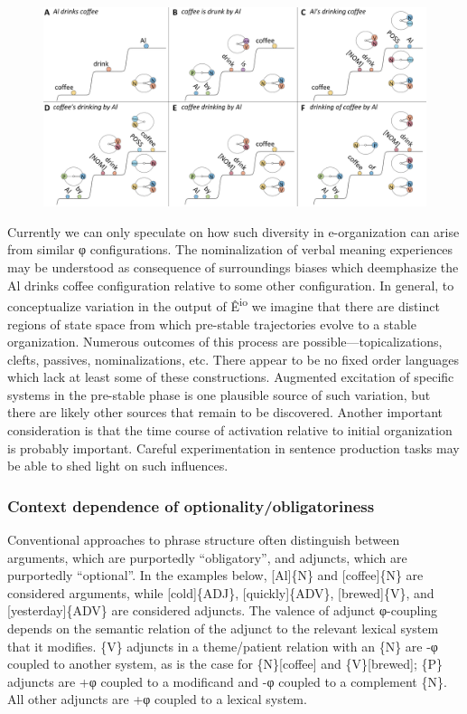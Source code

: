   
\begin{figure}
\includegraphics[width=\textwidth]{figures/Tilsen-img82.png}
\caption{\missingcaption}
\label{fig:}
\end{figure}
 

  Currently we can only speculate on how such diversity in e-organization can arise from similar φ configurations. The nominalization of verbal meaning experiences may be understood as consequence of surroundings biases which deemphasize the {\textbar}Al drinks coffee{\textbar} configuration relative to some other configuration. In general, to conceptualize variation in the output of Ê\textsuperscript{io} we imagine that there are distinct regions of state space from which pre-stable trajectories evolve to a stable organization. Numerous outcomes of this process are possible—topicalizations, clefts, passives, nominalizations, etc. There appear to be no fixed order languages which lack at least some of these constructions. Augmented excitation of specific systems in the pre-stable phase is one plausible source of such variation, but there are likely other sources that remain to be discovered. Another important consideration is that the time course of activation relative to initial organization is probably important. Careful experimentation in sentence production tasks may be able to shed light on such influences.

\subsubsection{Context dependence of optionality/obligatoriness}

Conventional approaches to phrase structure often distinguish between arguments, which are purportedly “obligatory”, and adjuncts, which are purportedly “optional”. In the examples below, [Al]\{N\} and [coffee]\{N\} are considered arguments, while [cold]\{ADJ\}, [quickly]\{ADV\}, [brewed]\{V\}, and [yesterday]\{ADV\} are considered adjuncts. The valence of adjunct φ-coupling depends on the semantic relation of the adjunct to the relevant lexical system that it modifies. \{V\} adjuncts in a theme/patient relation with an \{N\} are -φ coupled to another system, as is the case for \{N\}[coffee] and \{V\}[brewed]; \{P\} adjuncts are +φ coupled to a modificand and -φ coupled to a complement \{N\}. All other adjuncts are +φ coupled to a lexical system.

